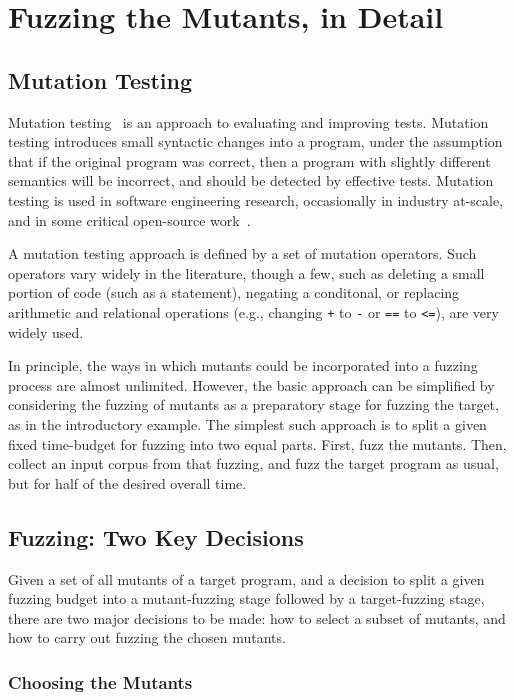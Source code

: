 \section{Fuzzing the Mutants, in Detail}


\subsection{Mutation Testing}

Mutation
testing~\cite{MutationSurvey,budd1979mutation,demillo1978hints} is an
approach to evaluating and improving tests.  Mutation testing
introduces small syntactic changes into a program, under the
assumption that if the original program was correct, then a program
with slightly different semantics will be incorrect, and should be
detected by effective tests.  Mutation testing is used in software
engineering research, occasionally in industry at-scale, and in some
critical open-source work~\cite{mutKernel,mutGoogle,mutFacebook}.

A mutation testing approach is defined by a set of mutation operators.
Such operators vary widely in the literature, though a few, such as
deleting a small portion of code (such as a statement), negating a
conditonal, or replacing arithmetic and relational operations (e.g.,
changing {\tt +} to {\tt -} or {\tt ==} to {\tt <=}), are very widely
used.


In principle, the ways in which mutants could be incorporated into a
fuzzing process are almost unlimited.  However, the basic approach can
be simplified by considering the fuzzing of mutants as a preparatory
stage for fuzzing the target, as in the introductory example.  The
simplest such approach is to split a given fixed time-budget for
fuzzing into two equal parts.
First, fuzz the mutants.  Then, collect an input corpus from that
fuzzing, and fuzz the target program as usual, but for half of the
desired overall time.

\subsection{Fuzzing: Two Key Decisions}

Given a set of all mutants of a target program, and a decision to
split a given fuzzing budget into a mutant-fuzzing stage followed by a
target-fuzzing stage, there are two major decisions to be made: how to
select a subset of mutants, and how to carry out fuzzing the chosen
mutants.

\subsubsection{Choosing the Mutants}

